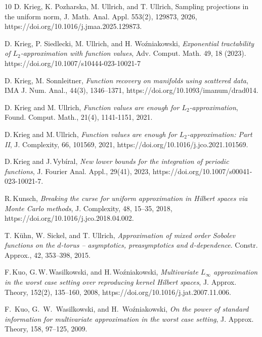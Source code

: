 \documentclass[a4paper,12pt]{amsart}
\theoremstyle{definition}
\theoremstyle{remark}
\begin{document}
{\begin{thebibliography}{10}
D. Krieg, K. Pozharska, M. Ullrich, and T. Ullrich,
 {Sampling projections in the uniform norm}, 
J. Math. Anal. Appl. 553(2), 129873, 2026,
https://doi.org/10.1016/j.jmaa.2025.129873.
 

 
 D. Krieg, P. Siedlecki, M. Ullrich, and H. Wo\'zniakowski,
{\it Exponential tractability of $L_2$-approximation with function values},
Adv. Comput. Math. 49, 18 (2023). https://doi.org/10.1007/s10444-023-10021-7

 D. Krieg, M. Sonnleitner,
{\it Function recovery on manifolds using scattered data}, 
{IMA J. Num. Anal.,  44(3), 1346--1371, https://doi.org/10.1093/imanum/drad014.
}

 D. Krieg and M. Ullrich,
{\it Function values are enough for $L_2$-approximation}, 
Found. Comput. Math., 21(4), 1141-1151, 2021.

 D.\,Krieg and M.\,Ullrich,
{\it Function values are enough for $L_2$-approximation: Part II}, 
J. Complexity, 66, 101569, 2021, https://doi.org/10.1016/j.jco.2021.101569.

 D.\,Krieg and J.\,Vyb\'iral, {\it New lower bounds for the integration of periodic functions},
{J. Fourier Anal. Appl., 29(41), 2023,
https://doi.org/10.1007/s00041-023-10021-7.}

   R.\,Kunsch,
 {\it Breaking the curse for uniform approximation in {H}ilbert spaces via {M}onte {C}arlo methods},
  {J. Complexity},
  {48},  {15--35},
  {2018},
https://doi.org/10.1016/j.jco.2018.04.002.


 T. Kühn, W. Sickel, and T. Ullrich, {\it Approximation of mixed order Sobolev functions on the $d$-torus -- asymptotics, preasymptotics and $d$-dependence}.
Constr. Approx., 42, 353--398, 2015.


F.\,Kuo, G.\,W.\,Wasilkowski, and H.\,Wo\'zniakowski,
{\it Multivariate {$L_\infty$} approximation in the worst case setting over reproducing kernel {H}ilbert spaces},
J. Approx. Theory, 152(2), 135--160, 2008,
https://doi.org/10.1016/j.jat.2007.11.006.


F.~Kuo, G.~W.~Wasilkowski, and H.~Wo\'zniakowski,
{\it On the power of standard information for multivariate approximation
  in the worst case setting},
J.  Approx. Theory, 158, 97--125, 2009.




\end{thebibliography}}
\end{document}
